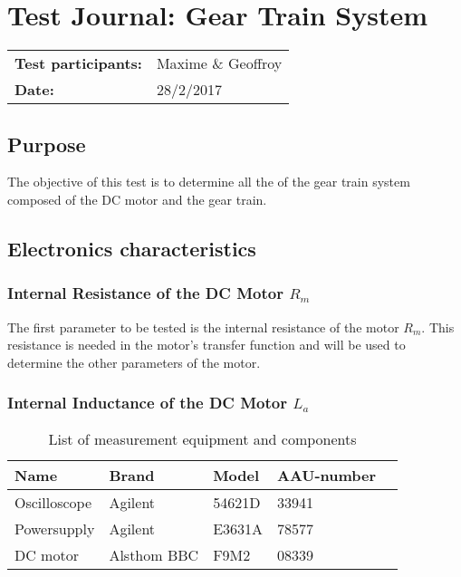 \graphicspath{{figures/appendix/}}
\chapter{Test Journal: Gear Train System}\label{appendix:DCMotorInductance}
\begin{table}[htbp]
\begin{tabular}{l l}
\textbf{Test participants:} & Maxime \& Geoffroy  \\
\textbf{Date:}  & 28/2/2017
\end{tabular}
\end{table}

\section*{Purpose}
The objective of this test is to determine all the of the gear train system composed of the DC motor and the gear train.
\section*{Electronics characteristics}
\subsection{Internal Resistance of the DC Motor $R_m$}
The first parameter to be tested is the internal resistance of the motor $R_m$. This resistance is needed in the motor's transfer function and will be used to determine the other parameters of the motor. 

\subsection{Internal Inductance of the DC Motor $L_a$}
\begin{table}[htbp]
	\centering
	\caption{List of measurement equipment and components}\label{tab_appendix:LaSetUp}

	\begin{tabularx}{\textwidth}{lXXXX}
		Name 				& Brand	& Model & AAU-number									\\ \toprule \rowcolor{lightGrey}
		Oscilloscope	& Agilent & 54621D & 33941 	\\
		Powersupply	& Agilent & E3631A & 78577\\ \rowcolor{lightGrey}
		DC motor & Alsthom BBC & F9M2& 08339
	\end{tabularx}
\end{table}
